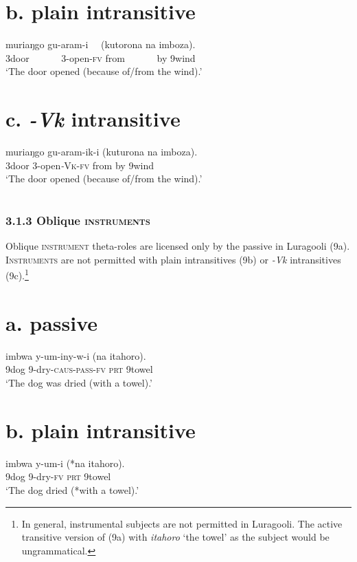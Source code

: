 \documentclass[output=paper]{langsci/langscibook}
\begin{document}
\begin{styleTabellenberschrift}
\chapter[b. plain intransitive]{b. \textbf{plain }\textbf{intransitive}}
\gll muriaŋgo gu-aram-i ~~(kutorona na imboza).\\
     3door ~~~~~~3-open-\textsc{fv}    from ~~~~~~by 9wind\\
\glt ‘The door opened (because of/from the wind).’
\z

\chapter[c. {}-Vk intransitive]{c. \textbf{\textit{{}-Vk}} \textbf{intransitive}}
\gll muriaŋgo gu-aram-ik-i    (kuturona na imboza).\\
     3door       3-open\textit{{}-}\textsc{Vk}{}-\textsc{fv}   from       by 9wind\\
\glt ‘The door opened (because of/from the wind).’
\z

\chapter[]{}
\subsection{3.1.3 Oblique \textsc{instruments}}

Oblique \textsc{instrument} theta-roles are licensed only by the passive in Luragooli (9a). \textsc{Instruments} are not permitted with plain intransitives (9b) or \textit{{}-Vk} intransitives (9c).\footnote{ In general, instrumental subjects are not permitted in Luragooli. The active transitive version of (9a) with \textit{itahoro} ‘the towel’ as the subject would be ungrammatical.}%
%

\chapter[a. passive]{a. \textbf{passive}}
\gll imbwa y-um-iny-w-i            (na    itahoro).\\
     9dog 9-dry-\textsc{caus}{}-\textsc{pass}{}-\textsc{fv}   \textsc{prt}  9towel\\
\glt ‘The dog was dried (with a towel).’
\z

\chapter[b. plain intransitive]{b. \textbf{plain intransitive}}
\gll imbwa y-um-i          (*na   itahoro).\\
     9dog   9-dry-\textsc{fv}         \textsc{prt} 9towel\\
\glt ‘The dog dried (*with a towel).’
\z


\end{styleTabellenberschrift}
\end{document}
